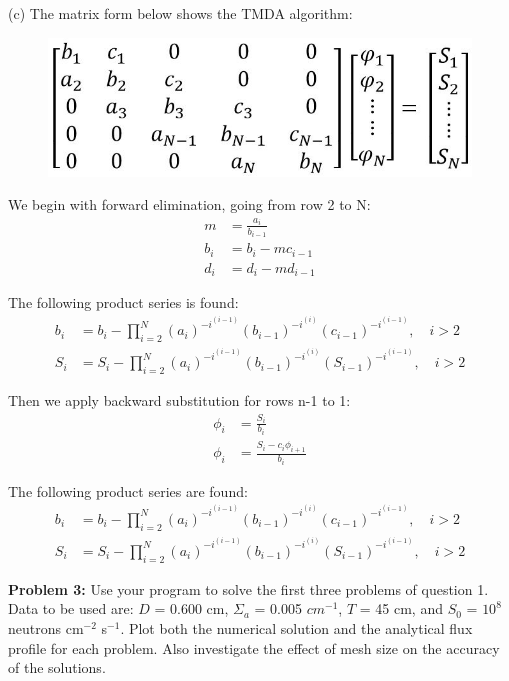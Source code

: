 \documentclass{amsart}
\theoremstyle{definition}
\begin{document}
(c) The matrix form below shows the TMDA algorithm:
\begin{figure}[h!]
    \includegraphics[width=.5\linewidth]{TDMA}
\end{figure}
\bigbreak


We begin with forward elimination, going from row 2 to N:
\begin{align*}
    m &= \frac{a_i}{b_{i-1}} \\
    b_i &= b_i - mc_{i-1} \\
    d_i &= d_i - md_{i-1}
\end{align*}

The following product series is found:
\begin{align*}
    b_i &= b_i - \prod_{i = 2}^{N} (a_i)^{-i^{(i-1)}} (b_{i-1})^{-i^{(i)}} (c_{i-1})^{-i^{(i-1)}}, \quad i>2 \\
    S_i &= S_i - \prod_{i = 2}^{N} (a_i)^{-i^{(i-1)}} (b_{i-1})^{-i^{(i)}} (S_{i-1})^{-i^{(i-1)}}, \quad i>2
\end{align*}

Then we apply backward substitution for rows n-1 to 1:
\begin{align*}
    \phi_i &= \frac{S_i}{b_i} \\
    \phi_i &= \frac{S_i-c_i\phi_{i+1}}{b_i}
\end{align*}

The following product series are found:
\begin{align*}
    b_i &= b_i - \prod_{i = 2}^{N} (a_i)^{-i^{(i-1)}} (b_{i-1})^{-i^{(i)}} (c_{i-1})^{-i^{(i-1)}}, \quad i>2 \\
    S_i &= S_i - \prod_{i = 2}^{N} (a_i)^{-i^{(i-1)}} (b_{i-1})^{-i^{(i)}} (S_{i-1})^{-i^{(i-1)}}, \quad i>2
\end{align*}
 


\newpage
\textbf{Problem 3:} Use your program to solve the first three problems of question 1.
Data to be used are: $D$ = 0.600 cm, $\Sigma_a$ = 0.005 $cm^{-1}$, $T$ = 45 cm, and $S_0$ = $10^8$ neutrons cm${}^{-2}$ s${}^{-1}$.
Plot both the numerical solution and the analytical flux profile for each problem.
Also investigate the effect of mesh size on the accuracy of the solutions.
\end{document}
